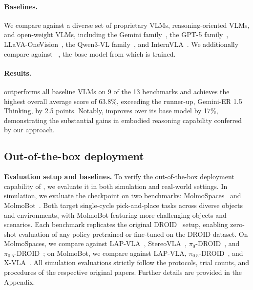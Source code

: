 \paragraph{Baselines.}
We compare \molmoer against a diverse set of proprietary VLMs, reasoning-oriented VLMs, and open-weight VLMs, including the Gemini family~\citep{team2024gemini,comanici2025gemini}, the GPT-5 family~\citep{singh2025openai}, LLaVA-OneVision~\citep{li2024llava}, the Qwen3-VL family~\citep{bai2025qwen3}, and InternVLA~\citep{wang2025internvl3}. We additionally compare against \molmot~\citep{clark2026molmo2openweightsdata}, the base model from which \molmoer is trained.

\paragraph{Results.} \molmoer outperforms all baseline VLMs on 9 of the 13 benchmarks and achieves the highest overall average score of 63.8\%, exceeding the runner-up, Gemini-ER 1.5 Thinking, by 2.5 points. Notably, \molmoer improves over its base model \molmot by 17\%, demonstrating the substantial gains in embodied reasoning capability conferred by our approach.

\subsection{Out-of-the-box deployment}
\label{sec:exp-outbox}

\textbf{Evaluation setup and baselines.} To verify the out-of-the-box deployment capability of \molmoactt, we evaluate it in both simulation and real-world settings. In simulation, we evaluate the \molmoacttdroid checkpoint on two benchmarks: MolmoSpaces~\citep{kim2026molmospaces} and MolmoBot~\citep{deshpande2026molmob0t}. Both target single-cycle pick-and-place tasks across diverse objects and environments, with MolmoBot featuring more challenging objects and scenarios. Each benchmark replicates the original DROID~\citep{khazatsky2024droid} setup, enabling zero-shot evaluation of any policy pretrained or fine-tuned on the DROID dataset. On MolmoSpaces, we compare \molmoacttdroid against LAP-VLA~\citep{zha2026lap}, StereoVLA~\citep{deng2025stereovla}, $\pi_{0}$-DROID~\citep{black2410pi0}, and $\pi_{0.5}$-DROID~\citep{intelligence2025pi05visionlanguageactionmodelopenworld}; on MolmoBot, we compare against LAP-VLA, $\pi_{0.5}$-DROID~\citep{intelligence2025pi05visionlanguageactionmodelopenworld}, and X-VLA~\citep{zheng2025x}. All simulation evaluations strictly follow the protocols, trial counts, and procedures of the respective original papers. Further details are provided in the Appendix.

